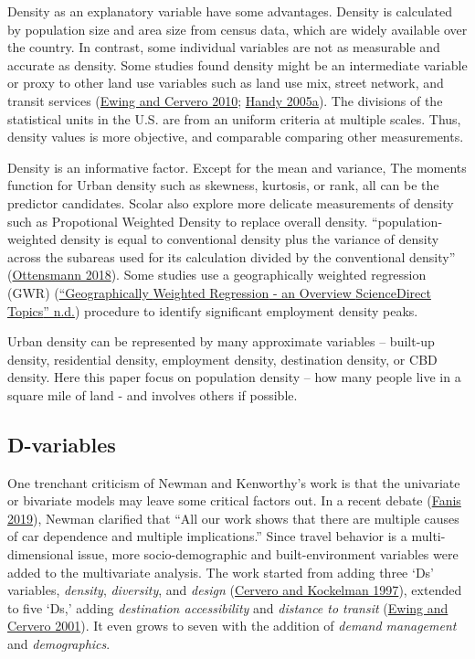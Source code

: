\documentclass[
  11pt,
  openany]{memoir}
\begin{document}
Density as an explanatory variable have some advantages. Density is calculated by population size and area size from census data, which are widely available over the country. In contrast, some individual variables are not as measurable and accurate as density. Some studies found density might be an intermediate variable or proxy to other land use variables such as land use mix, street network, and transit services (\protect\hyperlink{ref-ewingTravelBuiltEnvironment2010}{Ewing and Cervero 2010}; \protect\hyperlink{ref-handyCriticalAssessmentLiterature2005}{Handy 2005a}). The divisions of the statistical units in the U.S. are from an uniform criteria at multiple scales. Thus, density values is more objective, and comparable comparing other measurements.

Density is an informative factor. Except for the mean and variance, The moments function for Urban density such as skewness, kurtosis, or rank, all can be the predictor candidates. Scolar also explore more delicate measurements of density such as Propotional Weighted Density to replace overall density. ``population-weighted density is equal to conventional density plus the variance of density across the subareas used for its calculation divided by the conventional density'' (\protect\hyperlink{ref-ottensmannPopulationWeightedDensity2018}{Ottensmann 2018}). Some studies use a geographically weighted regression (GWR) (\protect\hyperlink{ref-GeographicallyWeightedRegression}{{``Geographically {Weighted Regression} - an Overview \textbar{} {ScienceDirect Topics}''} n.d.}) procedure to identify significant employment density peaks.

Urban density can be represented by many approximate variables -- built-up density, residential density, employment density, destination density, or CBD density. Here this paper focus on population density -- how many people live in a square mile of land - and involves others if possible.

\hypertarget{d-variables}{%
\subsection{D-variables}\label{d-variables}}

One trenchant criticism of Newman and Kenworthy's work is that the univariate or bivariate models may leave some critical factors out. In a recent debate (\protect\hyperlink{ref-fanisThreeStudiesThat2019}{Fanis 2019}), Newman clarified that ``All our work shows that there are multiple causes of car dependence and multiple implications.'' Since travel behavior is a multi-dimensional issue, more socio-demographic and built-environment variables were added to the multivariate analysis. The work started from adding three `Ds' variables, \emph{density}, \emph{diversity}, and \emph{design} (\protect\hyperlink{ref-cerveroTravelDemand3Ds1997}{Cervero and Kockelman 1997}), extended to five `Ds,' adding \emph{destination accessibility} and \emph{distance to transit} (\protect\hyperlink{ref-ewingTravelBuiltEnvironment2001}{Ewing and Cervero 2001}). It even grows to seven with the addition of \emph{demand management} and \emph{demographics}.
\end{document}
